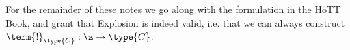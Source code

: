 For the remainder of these notes we go along with the formulation in the HoTT Book, and grant that Explosion is indeed valid, i.e. that we can always construct $\term{!}_{\type{C}}:\z \to \type{C}$.  



%  

